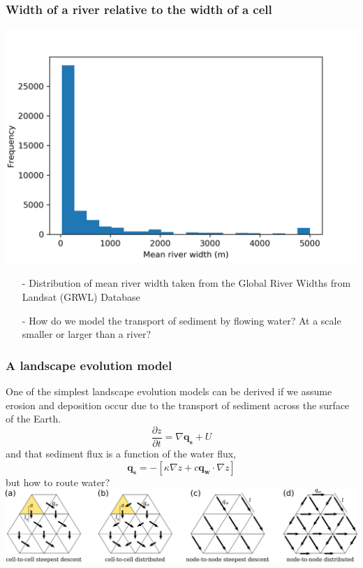 \documentclass[aspectratio=169]{beamer}
\begin{document}
\begin{frame}
    \frametitle{Width of a river relative to the width of a cell}
    \centering
    \includegraphics[height=0.6\paperheight]{./figures/river-width.png}
    \begin{itemize}
        \item[-]{Distribution of mean river width taken from the Global River Widths from Landsat (GRWL) Database \citep{allen-2018}}
        \item[-]{How do we model the transport of sediment by flowing water? At a scale smaller or larger than a river?}
    \end{itemize}
\end{frame}

\begin{frame}
    \frametitle{A landscape evolution model}
    One of the simplest landscape evolution models can be derived if we assume erosion and deposition occur due to the
    transport of sediment across the surface of the Earth.
    \[
    \frac{\partial z}{\partial t} = \nabla{\mathbf{q_{s}} + U}
    \]
    and that sediment flux is a function of the water flux,
    \[
    \mathbf{q_{s}} = - \left[\kappa \nabla{z} + c \mathbf{q_{w}} \cdot \nabla{z}\right]
    \]
    but how to route water?
    \includegraphics[width=0.8\paperwidth]{./figures/MFDandSFD.png}
\end{frame}
\end{document}
